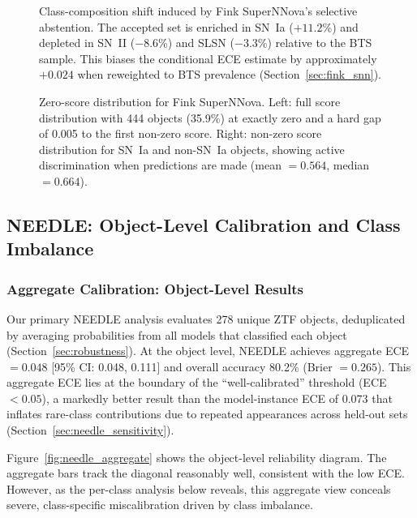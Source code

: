 \documentclass[twocolumn]{aastex631}
\begin{document}
\begin{figure}
\caption{Class-composition shift induced by Fink SuperNNova's selective abstention. The accepted set is enriched in SN~Ia ($+11.2$\%) and depleted in SN~II ($-8.6$\%) and SLSN ($-3.3$\%) relative to the BTS sample. This biases the conditional ECE estimate by approximately $+0.024$ when reweighted to BTS prevalence (Section~\ref{sec:fink_snn}). \label{fig:fink_snn_compshift}}
\end{figure}

\begin{figure}
\caption{Zero-score distribution for Fink SuperNNova. Left: full score distribution with 444 objects (35.9\%) at exactly zero and a hard gap of 0.005 to the first non-zero score. Right: non-zero score distribution for SN~Ia and non-SN~Ia objects, showing active discrimination when predictions are made (mean $= 0.564$, median $= 0.664$). \label{fig:fink_snn_hist}}
\end{figure}


\subsection{NEEDLE: Object-Level Calibration and Class Imbalance} \label{sec:needle}

\subsubsection{Aggregate Calibration: Object-Level Results}

Our primary NEEDLE analysis evaluates 278 unique ZTF objects, deduplicated by averaging probabilities from all models that classified each object (Section~\ref{sec:robustness}). At the object level, NEEDLE achieves aggregate ECE $= 0.048$ [95\% CI: 0.048, 0.111] and overall accuracy 80.2\% (Brier $= 0.265$). This aggregate ECE lies at the boundary of the ``well-calibrated'' threshold (ECE $< 0.05$), a markedly better result than the model-instance ECE of 0.073 that inflates rare-class contributions due to repeated appearances across held-out sets (Section~\ref{sec:needle_sensitivity}).

Figure~\ref{fig:needle_aggregate} shows the object-level reliability diagram. The aggregate bars track the diagonal reasonably well, consistent with the low ECE. However, as the per-class analysis below reveals, this aggregate view conceals severe, class-specific miscalibration driven by class imbalance.
\end{document}
